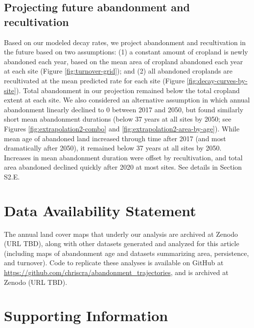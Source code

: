 \documentclass[9pt,twocolumn,twoside,lineno]{pnas-new}
\begin{document}
\hypertarget{projecting-future-abandonment-and-recultivation-1}{%
\subsection*{Projecting future abandonment and recultivation}\label{projecting-future-abandonment-and-recultivation-1}}

Based on our modeled decay rates, we project abandonment and recultivation in the future based on two assumptions: (1) a constant amount of cropland is newly abandoned each year, based on the mean area of cropland abandoned each year at each site (Figure \ref{fig:turnover-grid}); and (2) all abandoned croplands are recultivated at the mean predicted rate for each site (Figure \ref{fig:decay-curves-by-site}).
Total abandonment in our projection remained below the total cropland extent at each site.
We also considered an alternative assumption in which annual abandonment linearly declined to 0 between 2017 and 2050, but found similarly short mean abandonment durations (below 37 years at all sites by 2050; see Figures \ref{fig:extrapolation2-combo} and \ref{fig:extrapolation2-area-by-age}).
While mean age of abandoned land increased through time after 2017 (and most dramatically after 2050), it remained below 37 years at all sites by 2050.
Increases in mean abandonment duration were offset by recultivation, and total area abandoned declined quickly after 2020 at most sites.
See details in Section S2.E.

\hypertarget{data-availability-statement}{%
\section*{Data Availability Statement}\label{data-availability-statement}}

The annual land cover maps that underly our analysis are archived at Zenodo (URL TBD), along with other datasets generated and analyzed for this article (including maps of abandonment age and datasets summarizing area, persistence, and turnover).
Code to replicate these analyses is available on GitHub at \url{https://github.com/chriscra/abandonment_trajectories}, and is archived at Zenodo (URL TBD).

\hypertarget{supporting-information}{%
\section*{Supporting Information}\label{supporting-information}}
\end{document}
